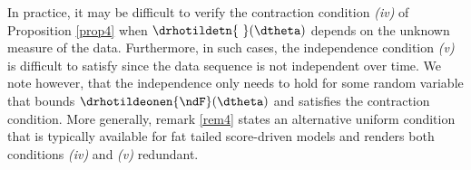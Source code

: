 






In practice, it may be difficult to verify the contraction condition  \textit{(iv)} of Proposition \ref{prop4} when $\drhotildetn{\ }(\dtheta)$ depends on the unknown measure of the data. Furthermore, in such cases,  the independence condition \emph{(v)} is difficult to satisfy since the data sequence is not independent over time. We note however, that the independence only needs to hold for some random variable that bounds $ \drhotildeonen{\ndF}(\dtheta)$ and satisfies the contraction condition. More generally, remark \ref{rem4} states an alternative uniform condition that is typically available for fat tailed score-driven models and renders both conditions \textit{(iv)} and \textit{(v)}  redundant. 

